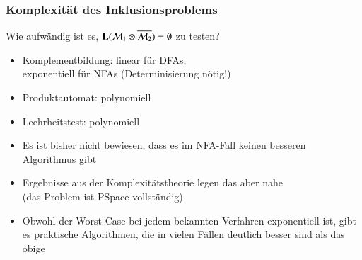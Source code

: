 \documentclass[aspectratio=1610,onlymath]{beamer}
\begin{document}
\begin{frame}\frametitle{Komplexität des Inklusionsproblems}

Wie aufwändig ist es, $\textbf{\textcolor{black}{L}}(\mathcal{M}_1\otimes\overline{\mathcal{M}_2})=\emptyset$ zu testen?%
\begin{itemize}
\item Komplementbildung: linear für DFAs,\\exponentiell für NFAs (Determinisierung nötig!)
\item Produktautomat: polynomiell
\item Leehrheitstest: polynomiell
\end{itemize}\pause

\pause
% 
% 
% 

\begin{itemize}
\item Es ist bisher nicht bewiesen, dass es im NFA-Fall keinen besseren Algorithmus gibt
\item Ergebnisse aus der Komplexitätstheorie legen das aber nahe\\[-1ex]
{\tiny \textcolor{devilscss}{(das Problem ist PSpace-vollständig)}}
\item Obwohl der Worst Case bei jedem bekannten Verfahren exponentiell ist, gibt es praktische Algorithmen, die in vielen Fällen deutlich besser sind als das obige
\end{itemize}

\end{frame}
\end{document}
